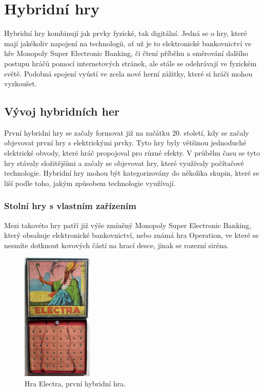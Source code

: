 \chapter{Hybridní hry}
Hybridní hry kombinují jak prvky fyzické, tak digitální. Jedná se o hry, které mají jakékoliv napojení na technologii, ať už je to elektronické bankovnictví ve hře Monopoly Super Electronic Banking, či čtení příběhu a směrování dalšího postupu hráčů pomocí internetových stránek, ale stále se odehrávají ve fyzickém světě. Podobná spojení vyústí ve zcela nové herní zážitky, které si hráči mohou vyzkoušet.

\section{Vývoj hybridních her}
První hybridní hry se začaly formovat již na začátku 20. století, kdy se začaly objevovat první hry s elektrickými prvky. Tyto hry byly většinou jednoduché elektrické obvody, které hráč propojoval pro různé efekty. V průběhu času se tyto hry stávaly složitějšími a začaly se objevovat hry, které využívaly počítačové technologie. Hybridní hry mohou být kategorizovány do několika skupin, které se liší podle toho, jakým způsobem technologie využívají.

\subsection{Stolní hry s vlastním zařízením}
Mezi takovéto hry patří již výše zmíněný Monopoly Super Electronic Banking, který obsahuje elektronické bankovnictví, nebo známá hra Operation, ve které se nesmíte dotknout kovových částí na hrací desce, jinak se rozezní siréna. 

\begin{figure}[H]
    \centering
    \includegraphics[width=0.3\textwidth]{resources/figures/electra.jpg}
    \caption{Hra Electra, první hybridní hra.\cite{history_of_hybrid_games}}
    \label{fig:electra}
\end{figure}

